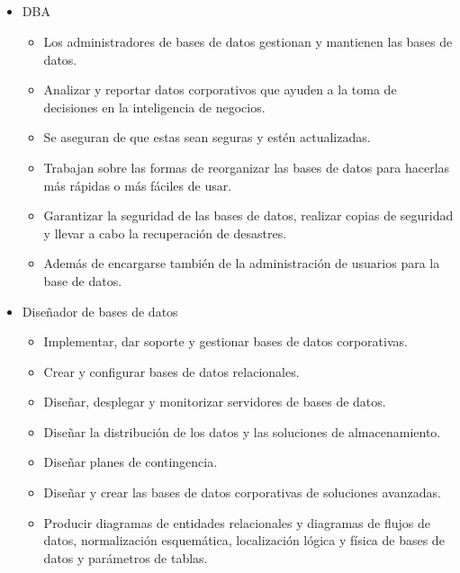 \documentclass{article}
\begin{document}
\subsection{}
\begin{itemize}
    \item DBA\\
    \begin{itemize}
        \item Los administradores de bases de datos gestionan y mantienen las bases de datos.
        \item Analizar y reportar datos corporativos que ayuden a la toma de decisiones en la inteligencia de negocios.
        \item Se aseguran de que estas sean seguras y estén actualizadas. \item Trabajan sobre las formas de reorganizar las bases de datos para hacerlas más rápidas o más fáciles de usar.
        \item Garantizar la seguridad de las bases de datos, realizar copias de seguridad y llevar a cabo la recuperación de desastres.
        \item Además de encargarse también de la administración de usuarios para la base de datos.
        
    \end{itemize}
    
    \item Diseñador de bases de datos
    \begin{itemize}
        \item Implementar, dar soporte y gestionar bases de datos corporativas.
        \item Crear y configurar bases de datos relacionales.
        \item Diseñar, desplegar y monitorizar servidores de bases de datos.
        \item Diseñar la distribución de los datos y las soluciones de almacenamiento.
        \item Diseñar planes de contingencia.
        \item Diseñar y crear las bases de datos corporativas de soluciones avanzadas.
        \item Producir diagramas de entidades relacionales y diagramas de flujos de datos, normalización esquemática, localización lógica y física de bases de datos y parámetros de tablas.
    \end{itemize}
\end{itemize}
\end{document}
